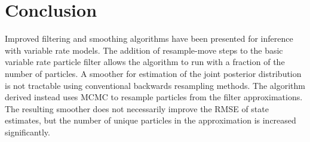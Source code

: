 \documentclass[journal]{IEEEtran}
\begin{document}
%





\section{Conclusion}
Improved filtering and smoothing algorithms have been presented for inference with variable rate models. The addition of resample-move steps to the basic variable rate particle filter allows the algorithm to run with a fraction of the number of particles. A smoother for estimation of the joint posterior distribution is not tractable using conventional backwards resampling methods. The algorithm derived instead uses MCMC to resample particles from the filter approximations. The resulting smoother does not necessarily improve the RMSE of state estimates, but the number of unique particles in the approximation is increased significantly.





\end{document}
